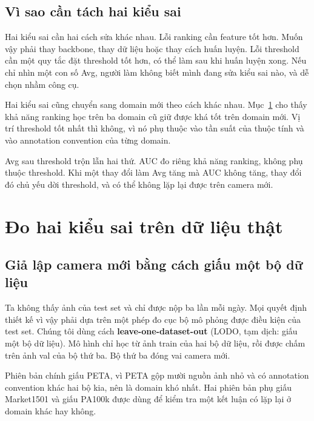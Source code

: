 \documentclass[11pt,a4paper]{article}
\begin{document}
\subsection{Vì sao cần tách hai kiểu sai}

Hai kiểu sai cần hai cách sửa khác nhau. Lỗi ranking cần feature tốt hơn. Muốn vậy phải thay backbone, thay dữ liệu hoặc thay cách huấn luyện. Lỗi threshold cần một quy tắc đặt threshold tốt hơn, có thể làm sau khi huấn luyện xong. Nếu chỉ nhìn một con số Avg, người làm không biết mình đang sửa kiểu sai nào, và dễ chọn nhầm công cụ.

Hai kiểu sai cũng chuyển sang domain mới theo cách khác nhau. Mục~\ref{sec:measure} cho thấy khả năng ranking học trên ba domain cũ giữ được khá tốt trên domain mới. Vị trí threshold tốt nhất thì không, vì nó phụ thuộc vào tần suất của thuộc tính và vào annotation convention của từng domain.

\begin{ghichu}
Avg sau threshold trộn lẫn hai thứ. AUC đo riêng khả năng ranking, không phụ thuộc threshold. Khi một thay đổi làm Avg tăng mà AUC không tăng, thay đổi đó chủ yếu dời threshold, và có thể không lặp lại được trên camera mới.
\end{ghichu}

\section{Đo hai kiểu sai trên dữ liệu thật}
\label{sec:measure}

\subsection{Giả lập camera mới bằng cách giấu một bộ dữ liệu}

Ta không thấy ảnh của test set và chỉ được nộp ba lần mỗi ngày. Mọi quyết định thiết kế vì vậy phải dựa trên một phép đo cục bộ mô phỏng được điều kiện của test set. Chúng tôi dùng cách \textbf{leave-one-dataset-out} (LODO, tạm dịch: giấu một bộ dữ liệu). Mô hình chỉ học từ ảnh train của hai bộ dữ liệu, rồi được chấm trên ảnh val của bộ thứ ba. Bộ thứ ba đóng vai camera mới.

Phiên bản chính giấu PETA, vì PETA gộp mười nguồn ảnh nhỏ và có annotation convention khác hai bộ kia, nên là domain khó nhất. Hai phiên bản phụ giấu Market1501 và giấu PA100k được dùng để kiểm tra một kết luận có lặp lại ở domain khác hay không.
\end{document}
